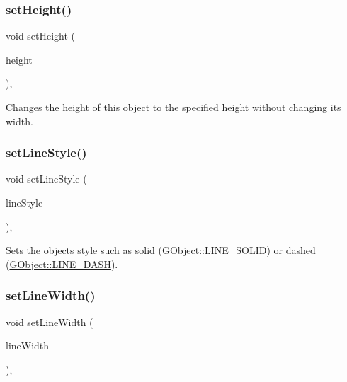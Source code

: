 \subsubsection{\texorpdfstring{set\+Height()}{setHeight()}}
{\footnotesize\ttfamily void set\+Height (\begin{DoxyParamCaption}\item[{double}]{height }\end{DoxyParamCaption})\hspace{0.3cm}{\ttfamily [virtual]}, {\ttfamily [inherited]}}



Changes the height of this object to the specified height without changing its width. 

\mbox{\label{classGObject_add11575087eb94f1a71faa3f826c6341}} 
\subsubsection{\texorpdfstring{set\+Line\+Style()}{setLineStyle()}}
{\footnotesize\ttfamily void set\+Line\+Style (\begin{DoxyParamCaption}\item[{\mbox{\hyperlink{classGObject_a86e0f5648542856159bb40775c854aa7}{G\+Object\+::\+Line\+Style}}}]{line\+Style }\end{DoxyParamCaption})\hspace{0.3cm}{\ttfamily [virtual]}, {\ttfamily [inherited]}}



Sets the object\textquotesingle{}s style such as solid (\mbox{\hyperlink{classGObject_a86e0f5648542856159bb40775c854aa7a700c78bc2cd76acaab26651bf7b4941f}{G\+Object\+::\+L\+I\+N\+E\+\_\+\+S\+O\+L\+ID}}) or dashed (\mbox{\hyperlink{classGObject_a86e0f5648542856159bb40775c854aa7a9ccba0845f785d81d07b333ae1aad84e}{G\+Object\+::\+L\+I\+N\+E\+\_\+\+D\+A\+SH}}). 

\mbox{\label{classGObject_afd6a47c6ea6a1f85ca05a65ba3ff3477}} 
\subsubsection{\texorpdfstring{set\+Line\+Width()}{setLineWidth()}}
{\footnotesize\ttfamily void set\+Line\+Width (\begin{DoxyParamCaption}\item[{double}]{line\+Width }\end{DoxyParamCaption})\hspace{0.3cm}{\ttfamily [virtual]}, {\ttfamily [inherited]}}



